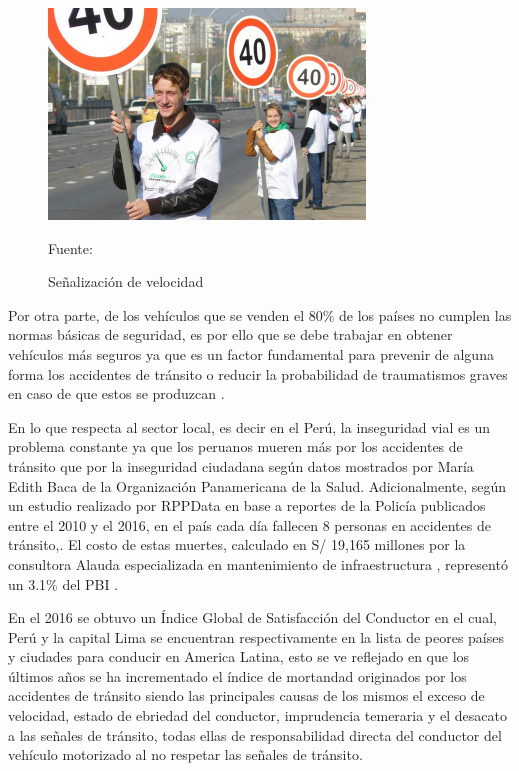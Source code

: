 	\vskip 0.15cm
	\begin{figure}[H]
	\begin{center}
	\includegraphics[width=0.75\textwidth]{images/intro/velocidad}
	\end{center}
	\begin{center}
	\caption{\small{Señalización de velocidad}}
	{\small{Fuente: \cite{OMS}}}
	\end{center}
	\vspace{-1.5em}
	\end{figure}
	
	Por otra parte, de los vehículos que se venden el 80\% de los países no cumplen las normas básicas de seguridad, es por ello que se debe trabajar en obtener vehículos más seguros ya que es un factor fundamental para prevenir de alguna forma los accidentes de tránsito o reducir la probabilidad de traumatismos graves en caso de que estos se produzcan \citep{OMS}.
	
	\vskip 0.15cm
	En lo que respecta al sector local, es decir en el Perú, la inseguridad vial es un problema constante ya que los peruanos mueren más por los accidentes de tránsito que por la inseguridad ciudadana según datos mostrados por María Edith Baca de la Organización Panamericana de la Salud\citep{OPS}. Adicionalmente, según un estudio realizado por RPPData en base a reportes de la Policía publicados entre el 2010 y el 2016, en el país cada día fallecen 8 personas en accidentes de tránsito,\citep{RPPData}. El costo de estas muertes, calculado en S/ 19,165 millones por la consultora Alauda especializada en mantenimiento de infraestructura , representó un 3.1\% del PBI \citep{Gestion2}.  
	
	
	\vskip 0.15cm
	En el 2016 se obtuvo un Índice Global de Satisfacción del Conductor \citep{CNN} en el cual, Perú y la capital Lima se encuentran respectivamente en la lista de peores países y ciudades para conducir en America Latina, esto se ve reflejado en que los últimos años se ha incrementado el índice de mortandad originados por los accidentes de tránsito siendo las principales causas de los mismos el exceso de velocidad, estado de ebriedad del conductor, imprudencia temeraria y el desacato a las señales de tránsito, todas ellas de responsabilidad directa del conductor del vehículo motorizado al no respetar las señales de tránsito\citep{SUTRAN}. 
	
